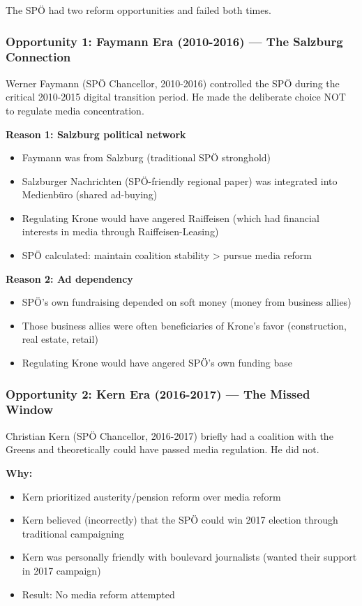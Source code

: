{The SPÖ had two reform opportunities and failed both times.

\subsubsection*{Opportunity 1: Faymann Era (2010-2016) --- The Salzburg Connection}

Werner Faymann (SPÖ Chancellor, 2010-2016) controlled the SPÖ during the critical 2010-2015 digital
transition period. He made the deliberate choice NOT to regulate media concentration.

\textbf{Reason 1: Salzburg political network}
\begin{itemize}
\item Faymann was from Salzburg (traditional SPÖ stronghold)
\item Salzburger Nachrichten (SPÖ-friendly regional paper) was integrated into Medienbüro (shared ad-buying)
\item Regulating Krone would have angered Raiffeisen (which had financial interests in media through Raiffeisen-Leasing)
\item SPÖ calculated: maintain coalition stability > pursue media reform
\end{itemize}

\textbf{Reason 2: Ad dependency}
\begin{itemize}
\item SPÖ's own fundraising depended on soft money (money from business allies)
\item Those business allies were often beneficiaries of Krone's favor (construction, real estate, retail)
\item Regulating Krone would have angered SPÖ's own funding base
\end{itemize}

\subsubsection*{Opportunity 2: Kern Era (2016-2017) --- The Missed Window}

Christian Kern (SPÖ Chancellor, 2016-2017) briefly had a coalition with the Greens and theoretically
could have passed media regulation. He did not.

\textbf{Why:}
\begin{itemize}
\item Kern prioritized austerity/pension reform over media reform
\item Kern believed (incorrectly) that the SPÖ could win 2017 election through traditional campaigning
\item Kern was personally friendly with boulevard journalists (wanted their support in 2017 campaign)
\item Result: No media reform attempted
\end{itemize}

}
